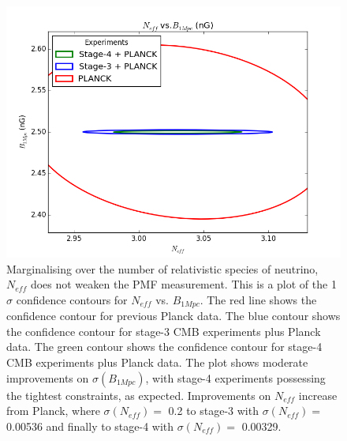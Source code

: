 {{\begin{figure}[h]
\centering
\includegraphics[scale=0.85]{images/contours/neff.png}
\caption{Marginalising over the number of relativistic species of neutrino, $N_{eff}$ does not weaken the PMF measurement. This is a plot of the 1$\sigma$ confidence contours for $N_{eff}$ vs. $B_{1Mpc}$. The red line shows the confidence contour for previous Planck data. The blue contour shows the confidence contour for stage-3 CMB experiments plus Planck data. The green contour shows the confidence contour for stage-4 CMB experiments plus Planck data. The plot shows moderate improvements on $\sigma(B_{1Mpc})$, with stage-4 experiments possessing the tightest constraints, as expected. Improvements on $N_{eff}$ increase from Planck, where $\sigma(N_{eff}) =$ 0.2 to stage-3 with $\sigma(N_{eff}) =$ 0.00536 and finally to stage-4 with $\sigma(N_{eff}) =$ 0.00329.}
\label{fig:neff}
\end{figure}

}}
